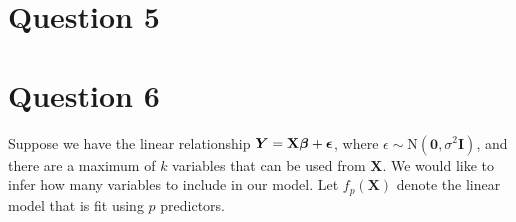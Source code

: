 \documentclass[10pt]{article}
\begin{document}
\section{Question 5} \noindent


\section{Question 6} \noindent
Suppose we have the linear relationship \(\bm{Y} = \mathbf{X}\bm{\beta} + \bm{\epsilon}\), where \(\epsilon \sim \mathrm{N}(\mathbf{0}, \sigma^2 \mathbf{I})\), 
and there are a maximum of \(k\) variables that can be used from \(\mathbf{X}\). We would like to infer how many variables to include in our model. 
Let \(f_p(\mathbf{X})\) denote the linear model that is fit using \(p\) predictors. 
\end{document}
